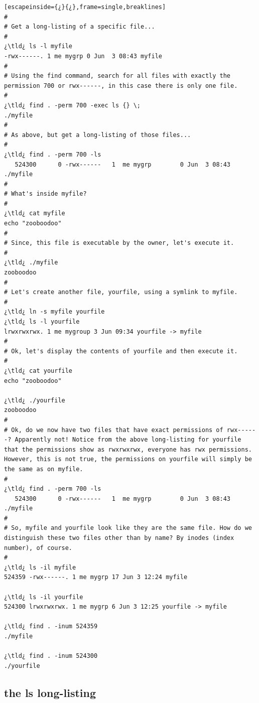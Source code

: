 \begin{lstlisting}[escapeinside={¿}{¿},frame=single,breaklines]
#
# Get a long-listing of a specific file...
#
¿\tld¿ ls -l myfile
-rwx------. 1 me mygrp 0 Jun  3 08:43 myfile
#
# Using the find command, search for all files with exactly the permission 700 or rwx------, in this case there is only one file.
#
¿\tld¿ find . -perm 700 -exec ls {} \;
./myfile
#
# As above, but get a long-listing of those files...
#
¿\tld¿ find . -perm 700 -ls
   524300      0 -rwx------   1  me mygrp        0 Jun  3 08:43 ./myfile
#
# What's inside myfile?
#   
¿\tld¿ cat myfile
echo "zooboodoo"
#
# Since, this file is executable by the owner, let's execute it.
# 
¿\tld¿ ./myfile
zooboodoo
#
# Let's create another file, yourfile, using a symlink to myfile.
#
¿\tld¿ ln -s myfile yourfile
¿\tld¿ ls -l yourfile
lrwxrwxrwx. 1 me mygroup 3 Jun 09:34 yourfile -> myfile
#
# Ok, let's display the contents of yourfile and then execute it.
#
¿\tld¿ cat yourfile
echo "zooboodoo"

¿\tld¿ ./yourfile
zooboodoo
#
# Ok, do we now have two files that have exact permissions of rwx------? Apparently not! Notice from the above long-listing for yourfile that the permissions show as rwxrwxrwx, everyone has rwx permissions. However, this is not true, the permissions on yourfile will simply be the same as on myfile.
#
¿\tld¿ find . -perm 700 -ls
   524300      0 -rwx------   1  me mygrp        0 Jun  3 08:43 ./myfile
#
# So, myfile and yourfile look like they are the same file. How do we distinguish these two files other than by name? By inodes (index number), of course.
#
¿\tld¿ ls -il myfile
524359 -rwx------. 1 me mygrp 17 Jun 3 12:24 myfile

¿\tld¿ ls -il yourfile  
524300 lrwxrwxrwx. 1 me mygrp 6 Jun 3 12:25 yourfile -> myfile

¿\tld¿ find . -inum 524359
./myfile

¿\tld¿ find . -inum 524300
./yourfile   
\end{lstlisting}

\subsection{the ls long-listing}

